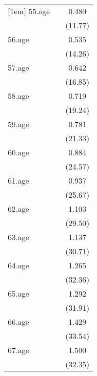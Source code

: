 {\begin{tabular}{l*{2}{c}}
[1em]
55.age      &                     &       0.480\sym{***}\\
            &                     &     (11.77)         \\
[1em]
56.age      &                     &       0.535\sym{***}\\
            &                     &     (14.26)         \\
[1em]
57.age      &                     &       0.642\sym{***}\\
            &                     &     (16.85)         \\
[1em]
58.age      &                     &       0.719\sym{***}\\
            &                     &     (19.24)         \\
[1em]
59.age      &                     &       0.781\sym{***}\\
            &                     &     (21.33)         \\
[1em]
60.age      &                     &       0.884\sym{***}\\
            &                     &     (24.57)         \\
[1em]
61.age      &                     &       0.937\sym{***}\\
            &                     &     (25.67)         \\
[1em]
62.age      &                     &       1.103\sym{***}\\
            &                     &     (29.50)         \\
[1em]
63.age      &                     &       1.137\sym{***}\\
            &                     &     (30.71)         \\
[1em]
64.age      &                     &       1.265\sym{***}\\
            &                     &     (32.36)         \\
[1em]
65.age      &                     &       1.292\sym{***}\\
            &                     &     (31.91)         \\
[1em]
66.age      &                     &       1.429\sym{***}\\
            &                     &     (33.54)         \\
[1em]
67.age      &                     &       1.500\sym{***}\\
            &                     &     (32.35)         \\

\end{tabular}}
